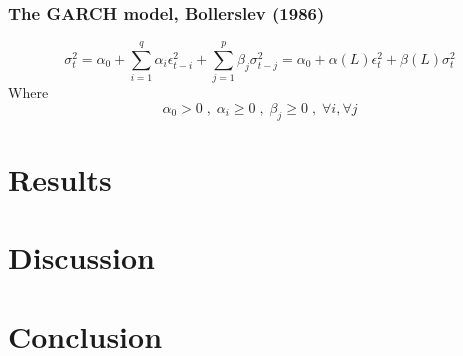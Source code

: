 \documentclass[a4paper, 12pt]{article}
\begin{document}
\section{The GARCH model, Bollerslev (1986)}

\[ \sigma_t^2=\alpha_0+\sum_{i=1}^{q}\alpha_i\epsilon_{t-i}^2+\sum_{j=1}^{p}\beta_j\sigma_{t-j}^2=\alpha_0+\alpha(L)\epsilon_t^2+\beta(L)\sigma_t^2\] 
Where 
\[ \alpha_0>0 \; , \; \alpha_i \ge 0 \; , \; \beta_j \ge 0 \; ,\; \forall i, \forall j\]


\part{Results}


\part{Discussion}



\part{Conclusion}
\end{document}
